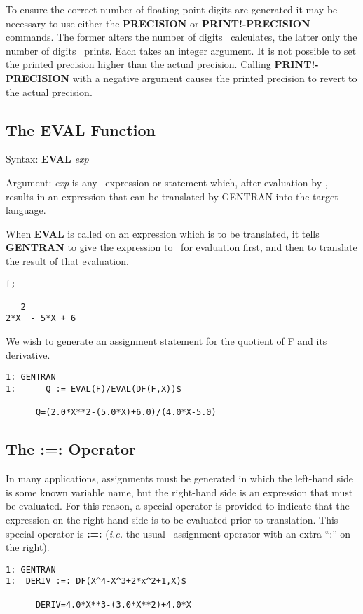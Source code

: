 To ensure the correct number of floating point digits are
generated it may be necessary to use either the {\bf PRECISION} or
{\bf PRINT!-PRECISION} commands.  The former alters the number of
digits \REDUCE\ calculates, the latter only the number of digits
\REDUCE\ prints.  Each takes an integer argument.  It is not possible to set
the printed precision higher than the actual precision.  Calling {\bf
PRINT!-PRECISION} with a negative argument causes the printed
precision to revert to the actual precision.

\subsection{The EVAL Function}
\label{eval}
\begin{describe}{Syntax:}
{\bf EVAL} {\it exp}
\end{describe}
\begin{describe}{Argument:}
{\it exp} is any \REDUCE\ expression or statement which, after evaluation
by \REDUCE, results in an expression that can be translated by
GENTRAN into the target language.
\end{describe}
When {\bf EVAL} is called on an expression which is to be translated, it
tells {\bf GENTRAN} to give the expression to \REDUCE\ for evaluation
first, and then to translate the result of that evaluation. 

\begin{verbatim}
f;

   2
2*X  - 5*X + 6
\end{verbatim}
We wish to generate an assignment statement for the quotient
of F and its derivative.
\begin{verbatim}
1: GENTRAN
1:      Q := EVAL(F)/EVAL(DF(F,X))$

      Q=(2.0*X**2-(5.0*X)+6.0)/(4.0*X-5.0)
\end{verbatim}

\subsection{The :=: Operator}
\index{:=:}
\label{rsetq}
In many applications, assignments must be generated in which the
left-hand side is some known variable name, but the
right-hand side is an expression that must be evaluated.  For
this reason, a special operator is provided to indicate that the expression
on the right-hand side is to be evaluated prior to translation.  This
special operator is {\bf :=:} ({\em i.e.} the usual \REDUCE\ assignment operator
with an extra ``:'' on the right).
\begin{describe}{\example}
\begin{verbatim}
1: GENTRAN
1:  DERIV :=: DF(X^4-X^3+2*x^2+1,X)$

      DERIV=4.0*X**3-(3.0*X**2)+4.0*X
\end{verbatim}
\end{describe}

